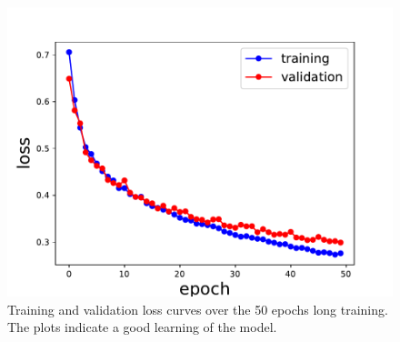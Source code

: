 \begin{figure}[H]
    \centering
    \includegraphics[width=\textwidth]{figures/Phasing/loss_central_patch.pdf}
    \caption{Training and validation loss curves over the 50 epochs long training. The plots indicate a good learning 
    of the model.}
    
    \label{fig:loss_3D_lowstrain}

\end{figure}

